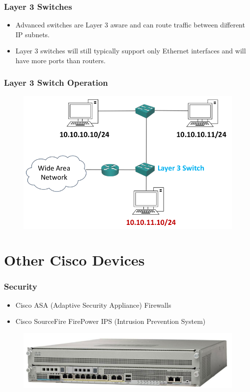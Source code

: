 \documentclass[pdflatex,compress,mathserif]{beamer}
\begin{document}
\begin{frame}
	\frametitle{Layer 3 Switches}
	\begin{itemize}
		\item Advanced switches are Layer 3 aware and can route traffic between different IP subnets.
		\item Layer 3 switches will still typically support only Ethernet interfaces and will have more ports than routers.
	\end{itemize}
\end{frame}

\begin{frame}
	\frametitle{Layer 3 Switch Operation}
	\begin{figure}
		\centering
		\includegraphics[width=0.8\linewidth]{img/img32}
	\end{figure}
\end{frame}

\section{Other Cisco Devices}

\begin{frame}
	\frametitle{Security}
	\begin{itemize}
		\item Cisco ASA (Adaptive Security Appliance) Firewalls
		\item Cisco SourceFire FirePower IPS (Intrusion Prevention System)
	\end{itemize}
	\begin{figure}
		\centering
		\includegraphics[width=0.8\linewidth]{img/img33}
	\end{figure}
\end{frame}
\end{document}
